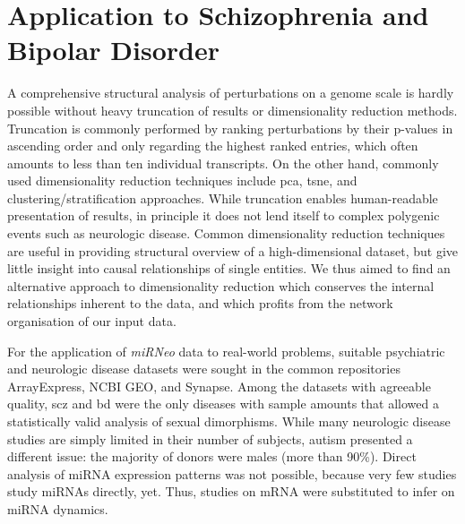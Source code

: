 \section{Application to Schizophrenia and Bipolar Disorder}
A comprehensive structural analysis of perturbations on a genome scale is hardly possible without heavy truncation of results or dimensionality reduction methods. Truncation is commonly performed by ranking perturbations by their p-values in ascending order and only regarding the highest ranked entries, which often amounts to less than ten individual transcripts. On the other hand, commonly used dimensionality reduction techniques include \ac{pca}, \ac{tsne}, and clustering/stratification approaches. While truncation enables human-readable presentation of results, in principle it does not lend itself to complex polygenic events such as neurologic disease. Common dimensionality reduction techniques are useful in providing structural overview of a high-dimensional dataset, but give little insight into causal relationships of single entities. We thus aimed to find an alternative approach to dimensionality reduction which conserves the internal relationships inherent to the data, and which profits from the network organisation of our input data.

For the application of \emph{miRNeo} data to real-world problems, suitable psychiatric and neurologic disease datasets were sought in the common repositories ArrayExpress, NCBI GEO, and Synapse. Among the datasets with agreeable quality, \ac{scz} and \ac{bd} were the only diseases with sample amounts that allowed a statistically valid analysis of sexual dimorphisms. While many neurologic disease studies are simply limited in their number of subjects, autism presented a different issue: the majority of donors were males (more than 90\%). Direct analysis of miRNA expression patterns was not possible, because very few studies study miRNAs directly, yet. Thus, studies on mRNA were substituted to infer on miRNA dynamics.


